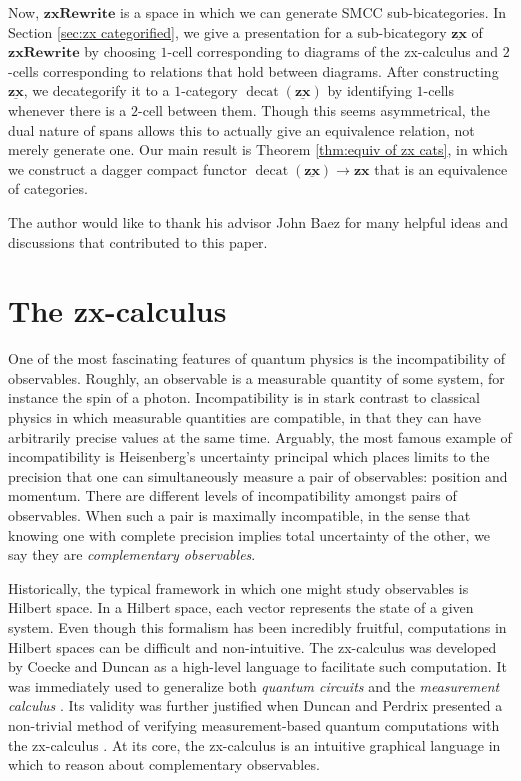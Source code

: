 \documentclass[11pt]{amsart}
\theoremstyle{definition}
\begin{document}
Now, $\mathbf{zxRewrite}$ is a space in which we can generate SMCC sub-bicategories. In Section \ref{sec:zx categorified}, we give a presentation for a sub-bicategory $\underline{\mathbf{zx}}$ of $\mathbf{zxRewrite}$ by choosing $1$-cell corresponding to diagrams of the zx-calculus and $2$-cells corresponding to relations that hold between diagrams.  After constructing $\underline{\mathbf{zx}}$, we decategorify it to a $1$-category $\operatorname{decat}(\underline{\mathbf{zx}})$ by identifying $1$-cells whenever there is a $2$-cell between them.  Though this seems asymmetrical, the dual nature of spans allows this to actually give an equivalence relation, not merely generate one.  Our main result is Theorem \ref{thm:equiv of zx cats}, in which we construct a dagger compact functor $\operatorname{decat}(\underline{\mathbf{zx}}) \to \mathbf{zx}$ that is an equivalence of categories.  

The author would like to thank his advisor John Baez for many helpful ideas and discussions that contributed to this paper.   

\section{The zx-calculus}
\label{sec:ZxCalc}

One of the most fascinating features of quantum physics is the incompatibility of observables. Roughly, an observable is a measurable quantity of some system, for instance the spin of a photon.  Incompatibility is in stark contrast to classical physics in which measurable quantities are compatible, in that they can have arbitrarily precise values at the same time.   Arguably, the most famous example of incompatibility is Heisenberg's uncertainty principal which places limits to the precision that one can simultaneously measure a pair of observables: position and momentum.  There are different levels of incompatibility amongst pairs of observables. When such a pair is maximally incompatible, in the sense that knowing one with complete precision implies total uncertainty of the other, we say they are \emph{complementary observables}.  

Historically, the typical framework in which one might study observables is Hilbert space.  In a Hilbert space, each vector represents the state of a given system. Even though this formalism has been incredibly fruitful, computations in Hilbert spaces can be difficult and non-intuitive. The zx-calculus was developed by Coecke and Duncan \cite{CoeckeDuncan_QuantumObsFullPaper} as a high-level language to facilitate such computation.  It was immediately used to generalize both \emph{quantum circuits} \cite{NielsenChuang_QuantumCompInfo}  and the \emph{measurement calculus} \cite{DanosKashefiPanang_MeasurementCalc}. Its validity was further justified when Duncan and Perdrix presented a non-trivial method of verifying measurement-based quantum computations with the zx-calculus \cite{DuncanPerdrix_RewritingQuantumCompu}.  At its core, the zx-calculus is an intuitive graphical language in which to reason about complementary observables. 
\end{document}
